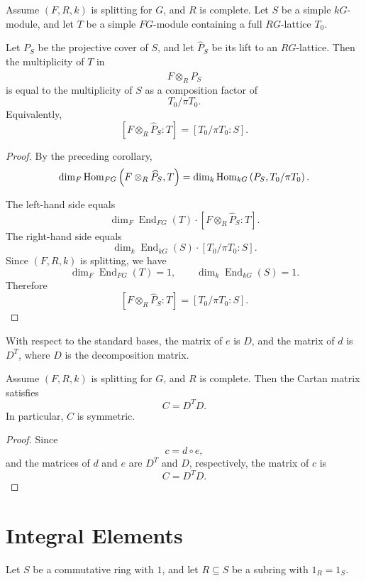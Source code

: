 \begin{theorem}
Assume \((F,R,k)\) is splitting for \(G\), and \(R\) is complete.
Let \(S\) be a simple \(kG\)-module, and let \(T\) be a simple \(FG\)-module containing
a full \(RG\)-lattice \(T_0\).

Let \(P_S\) be the projective cover of \(S\), and let \(\widehat P_S\) be its lift to an
\(RG\)-lattice. Then the multiplicity of \(T\) in
\[
F\otimes_R\widehat P_S
\]
is equal to the multiplicity of \(S\) as a composition factor of
\[
T_0/\pi T_0.
\]
Equivalently,
\[
\left[F\otimes_R\widehat P_S:T\right]
=
\left[T_0/\pi T_0:S\right].
\]
\end{theorem}

\begin{proof}
By the preceding corollary,
\[
\operatorname{dim}_F\mathrm{Hom}_{FG}\left(F\otimes_R\widehat P_S,T\right)
=
\operatorname{dim}_k\mathrm{Hom}_{kG}\left(P_S,T_0/\pi T_0\right).
\]

The left-hand side equals
\[
\operatorname{dim}_F\operatorname{End}_{FG}(T)\cdot
\left[F\otimes_R\widehat P_S:T\right].
\]
The right-hand side equals
\[
\operatorname{dim}_k\operatorname{End}_{kG}(S)\cdot
\left[T_0/\pi T_0:S\right].
\]
Since \((F,R,k)\) is splitting, we have
\[
\operatorname{dim}_F\operatorname{End}_{FG}(T)=1,
\qquad
\operatorname{dim}_k\operatorname{End}_{kG}(S)=1.
\]
Therefore
\[
\left[F\otimes_R\widehat P_S:T\right]
=
\left[T_0/\pi T_0:S\right].
\]
\end{proof}

With respect to the standard bases, the matrix of \(e\) is \(D\), and the matrix of \(d\)
is \(D^T\), where \(D\) is the decomposition matrix.

\begin{corollary}
Assume \((F,R,k)\) is splitting for \(G\), and \(R\) is complete. Then the Cartan matrix
satisfies
\[
C=D^T D.
\]
In particular, \(C\) is symmetric.
\end{corollary}

\begin{proof}
Since
\[
c=d\circ e,
\]
and the matrices of \(d\) and \(e\) are \(D^T\) and \(D\), respectively, the matrix of \(c\)
is
\[
C=D^T D.
\]
\end{proof}

\section{Integral Elements}

Let \(S\) be a commutative ring with \(1\), and let \(R\subseteq S\) be a subring with
\(1_R=1_S\).

